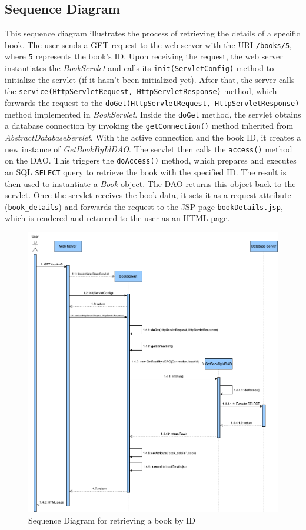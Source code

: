 \subsection{Sequence Diagram}

This sequence diagram illustrates the process of retrieving the details of a specific book.
The user sends a GET request to the web server with the URI \texttt{/books/5}, where \texttt{5} represents the book's ID. Upon receiving the request, the web server instantiates the \textit{BookServlet} and calls its \texttt{init(ServletConfig)} method to initialize the servlet (if it hasn't been initialized yet). After that, the server calls the \texttt{service(HttpServletRequest, HttpServletResponse)} method, which forwards the request to the \texttt{doGet(HttpServletRequest, HttpServletResponse)} method implemented in \textit{BookServlet}.
Inside the \texttt{doGet} method, the servlet obtains a database connection by invoking the \texttt{getConnection()} method inherited from \textit{AbstractDatabaseServlet}. With the active connection and the book ID, it creates a new instance of \textit{GetBookByIdDAO}.
The servlet then calls the \texttt{access()} method on the DAO. This triggers the \texttt{doAccess()} method, which prepares and executes an SQL \texttt{SELECT} query to retrieve the book with the specified ID. The result is then used to instantiate a \textit{Book} object. The DAO returns this object back to the servlet.
Once the servlet receives the book data, it sets it as a request attribute (\verb|book_details|) and forwards the request to the JSP page \texttt{bookDetails.jsp}, which is rendered and returned to the user as an HTML page.

\clearpage
\begin{figure}[h!]
    \centering
    \includegraphics[width=\textwidth]{photos/SequenceDiagram.png}
    \caption{Sequence Diagram for retrieving a book by ID}
    \label{fig:sequencediagram}
\end{figure}